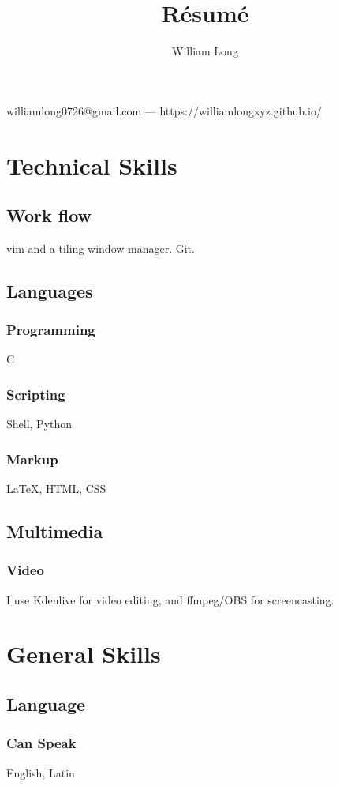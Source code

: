 \documentclass{article}
\makeatletter
\renewcommand{\maketitle}{
\begin{center}
{\huge\bfseries
\theauthor}

\vspace{.25em}

williamlong0726@gmail.com --- https://williamlongxyz.github.io/

\end{center}
}
\makeatother
\begin{document}
\title{R\'esum\'e}
\author{William Long}

\maketitle

\section{Technical Skills}

\subsection{Work flow}
vim and a tiling window manager. Git.

\subsection{Languages}

\subsubsection{Programming}
C
\subsubsection{Scripting}
Shell, Python
\subsubsection{Markup}
{\LaTeX}, HTML, CSS

\subsection{Multimedia}

\subsubsection{Video}
I use Kdenlive for video editing, and ffmpeg/OBS for screencasting.


\section{General Skills}
\subsection{Language}
\subsubsection{Can Speak}
English, Latin
\end{document}
